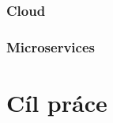 \documentclass[
  master,
  biblatex,
  glossaries,
  index
]{kidiplom}
\begin{document}
\subsubsection{Cloud}

\subsubsection{Microservices}


\section{Cíl práce}

\printbibliography
\end{document}
